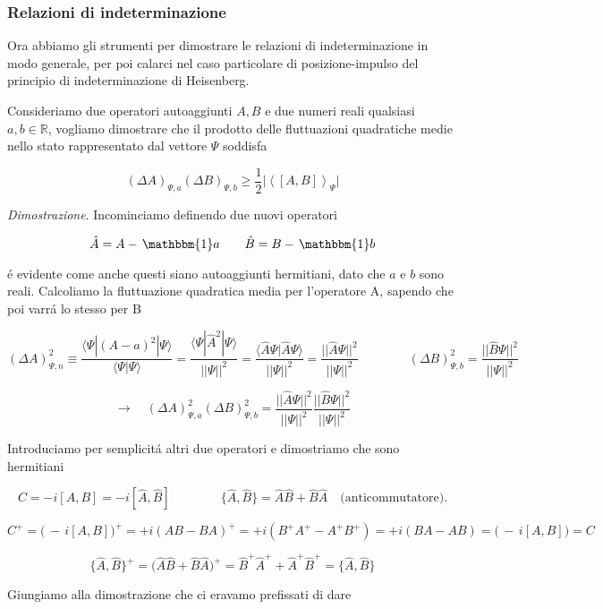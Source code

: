 \begin{enumerate}
\subsubsection{Relazioni di indeterminazione}

Ora abbiamo gli strumenti per dimostrare le relazioni di indeterminazione in modo generale, per poi calarci nel caso particolare di posizione-impulso del principio di indeterminazione di Heisenberg.

Consideriamo due operatori autoaggiunti $A, B$ e due numeri reali qualsiasi $a, b \in \mathbb{R}$, vogliamo dimostrare che il prodotto delle fluttuazioni quadratiche medie nello stato rappresentato dal vettore $\Psi$ soddisfa

$$(\Delta A)_{\Psi,a}(\Delta B)_{\Psi,b}\geq\frac{1}{2}\vert\left<[A,B]\right>_{\Psi}\vert$$

\textit{Dimostrazione}. Incominciamo definendo due nuovi operatori

$$\hat{A}=A-\,\mathbbm{1}a\qquad\hat{B}=B-\,\mathbbm{1}b$$

\'e evidente come anche questi siano autoaggiunti hermitiani, dato che $a$ e $b$ sono reali. Calcoliamo la fluttuazione quadratica media per l'operatore A, sapendo che poi varr\'a lo stesso per B

$$(\Delta A)^{2}_{\Psi,n}\equiv\frac{\langle\Psi|(A-a)^{2}|\Psi\rangle}{\langle\Psi|\Psi\rangle}=\frac{\langle\Psi|\hat{A}^{2}|\Psi\rangle}{||\Psi||^{2}}=\frac{\langle\hat{A}\Psi|\hat{A}\Psi\rangle}{||\Psi||^{2}}=\frac{||\hat{A}\Psi||^{2}}{||\Psi||^{2}}\qquad\qquad(\Delta B)^{2}_{\Psi,b}=\frac{||\hat{B}\Psi||^{2}}{||\Psi||^{2}}$$ 

$$\longrightarrow\quad(\Delta A)^{2}_{\Psi,a}(\Delta B)^{2}_{\Psi,b}=\frac{||\hat{A}\Psi||^{2}}{||\Psi||^{2}}\frac{||\hat{B}\Psi||^{2}}{||\Psi||^{2}}$$  

Introduciamo per semplicit\'a altri due operatori e dimostriamo che sono hermitiani

$$C=-i[A,B]=-i[\hat{A},\hat{B}]\qquad\qquad\{\hat{A},\hat{B}\}=\hat{A}\hat{B}+\hat{B}\hat{A}\quad\text{(anticommutatore)}.$$
	
	
$$C^+=\big(\,-\,i[A,B]\big)^+=+i(AB-BA)^+=+i(B^+A^+-A^+B^+)=+i(BA-AB)=\big(\,-\,i[A,B]\big)=C$$

$$\{\hat{A},\hat{B}\}^+=\big(\hat{A}\hat{B}+\hat{B}\hat{A}\big)^+=\hat{B}^+\hat{A}^++\hat{A}^+\hat{B}^+=\{\hat{A},\hat{B}\}$$

Giungiamo alla dimostrazione che ci eravamo prefissati di dare





\end{enumerate}

